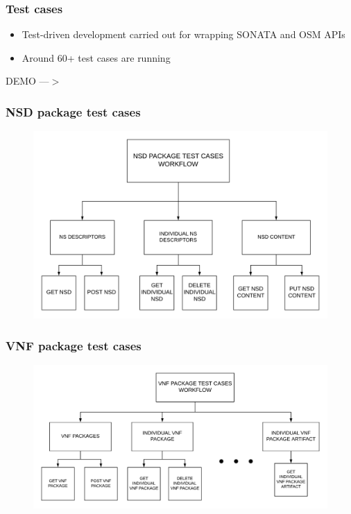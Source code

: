 \begin{frame}
\frametitle{Test cases}

\begin{itemize}
	\item Test-driven development carried out for wrapping SONATA and OSM APIs
	
	\item  Around 60+ test cases are running 
	
\end{itemize}

\end{frame}
\begin{frame}
\Huge{\centerline{DEMO ---$ > $}}
\end{frame}

\begin{frame}
\frametitle{NSD package test cases}
\begin{figure}
	\centering
	\includegraphics[width=0.8\linewidth]{images/NSD}
	\label{fig:nsd}
\end{figure}


\end{frame}

\begin{frame}
\frametitle{VNF package test cases}
\begin{figure}
	\centering
	\includegraphics[width=0.9\linewidth]{images/VNF}
	\label{fig:vnf}
\end{figure}


\end{frame}

